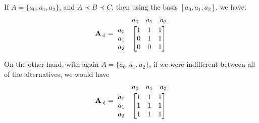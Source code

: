 \documentclass{article}
\begin{document}
	\begin{minipage}{0.47\linewidth}
		\begin{example}\label{ex:mat1}
			If $A = \{a_0, a_1, a_2\}$, and $A \prec B \prec C$, then using the basis $[a_0, a_1, a_2]$, we have: 
			\[\mathbf A_\preccurlyeq =~ \begin{matrix} & \begin{matrix}a_0 & a_1 & a_2\end{matrix} \\[0.2em]
			\begin{matrix}a_0 \\ a_1 \\ a_2\end{matrix} & \begin{bmatrix}
			1 & 1 & 1 \\
			0 & 1 & 1 \\
			0 & 0 & 1
			\end{bmatrix}\end{matrix} \]
		\end{example}
	\end{minipage}
	\hfill
	\begin{minipage}{0.47\linewidth}
		\begin{example}\label{ex:mat2}
			On the other hand, with again  $A = \{a_0, a_1, a_2\}$, if we were indifferent between all of the alternatives, we would have
			\[\mathbf A_\preccurlyeq =~ \begin{matrix} & \begin{matrix}a_0 & a_1 & a_2\end{matrix} \\[0.2em]
			\begin{matrix}a_0 \\ a_1 \\ a_2\end{matrix} & \begin{bmatrix}
			1 & 1 & 1 \\
			1 & 1 & 1 \\
			1 & 1 & 1
			\end{bmatrix}\end{matrix} \]
		\end{example}
	\end{minipage}\\

	
\end{document}
